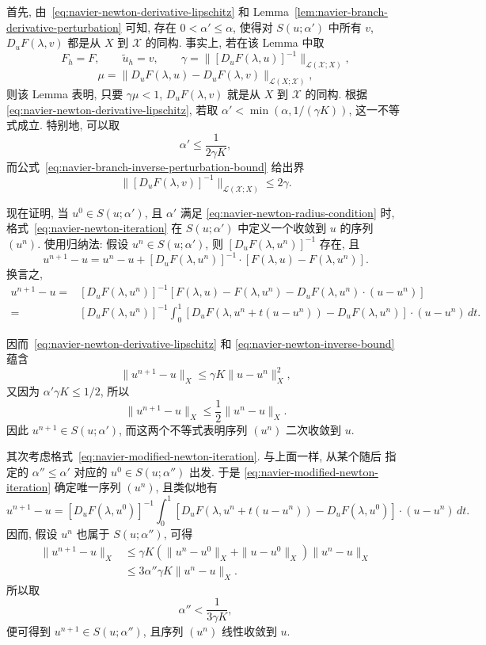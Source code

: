 \begin{Proof}
首先, 由 \,\eqref{eq:navier-newton-derivative-lipschitz} 和
Lemma~\ref{lem:navier-branch-derivative-perturbation} 可知, 存在
$0<\alpha'\leq\alpha$, 使得对 $S(u;\alpha')$ 中所有 $v$,
$D_uF(\lambda,v)$ 都是从 $X$ 到 $\mathscr X$ 的同构. 事实上, 若在该 Lemma 中取
\[
F_h=F,\qquad\widetilde u_h=v,
\qquad\gamma=\|[D_uF(\lambda,u)]^{-1}\|_{\mathcal L(\mathscr X;X)},
\]
\[
\mu=\|D_uF(\lambda,u)-D_uF(\lambda,v)\|_{\mathcal L(X;\mathscr X)},
\]
则该 Lemma 表明, 只要 $\gamma\mu<1$, $D_uF(\lambda,v)$ 就是从 $X$ 到
$\mathscr X$ 的同构. 根据 \,\eqref{eq:navier-newton-derivative-lipschitz},
若取 $\alpha'<\min(\alpha,1/(\gamma K))$, 这一不等式成立. 特别地, 可以取
\begin{equation}
\label{eq:navier-newton-radius-condition}
\alpha'\leq\frac1{2\gamma K},
\end{equation}
而公式 \,\eqref{eq:navier-branch-inverse-perturbation-bound} 给出界
\begin{equation}
\label{eq:navier-newton-inverse-bound}
\|[D_uF(\lambda,v)]^{-1}\|_{\mathcal L(\mathscr X;X)}\leq2\gamma.
\end{equation}

现在证明, 当 $u^0\in S(u;\alpha')$, 且 $\alpha'$ 满足
\eqref{eq:navier-newton-radius-condition} 时, 格式 \,\eqref{eq:navier-newton-iteration}
在 $S(u;\alpha')$ 中定义一个收敛到 $u$ 的序列 $(u^n)$. 使用归纳法: 假设
$u^n\in S(u;\alpha')$, 则 $[D_uF(\lambda,u^n)]^{-1}$ 存在, 且
\[
u^{n+1}-u=u^n-u+[D_uF(\lambda,u^n)]^{-1}
\mathbin{\cdot}[F(\lambda,u)-F(\lambda,u^n)].
\]
换言之,
\[
\begin{aligned}
u^{n+1}-u
={}&[D_uF(\lambda,u^n)]^{-1}
[F(\lambda,u)-F(\lambda,u^n)-D_uF(\lambda,u^n)\mathbin{\cdot}(u-u^n)]\\
={}&[D_uF(\lambda,u^n)]^{-1}
\int_0^1[D_uF(\lambda,u^n+t(u-u^n))-D_uF(\lambda,u^n)]
\mathbin{\cdot}(u-u^n)\,dt.
\end{aligned}
\]

因而 \,\eqref{eq:navier-newton-derivative-lipschitz} 和
\eqref{eq:navier-newton-inverse-bound} 蕴含
\[
\|u^{n+1}-u\|_X\leq\gamma K\|u-u^n\|_X^2,
\]
又因为 $\alpha'\gamma K\leq1/2$, 所以
\[
\|u^{n+1}-u\|_X\leq\frac12\|u^n-u\|_X.
\]
因此 $u^{n+1}\in S(u;\alpha')$, 而这两个不等式表明序列 $(u^n)$ 二次收敛到 $u$.

其次考虑格式 \,\eqref{eq:navier-modified-newton-iteration}. 与上面一样, 从某个随后
指定的 $\alpha''\leq\alpha'$ 对应的 $u^0\in S(u;\alpha'')$ 出发. 于是
\eqref{eq:navier-modified-newton-iteration} 确定唯一序列 $(u^n)$, 且类似地有
\[
u^{n+1}-u=[D_uF(\lambda,u^0)]^{-1}
\int_0^1[D_uF(\lambda,u^n+t(u-u^n))-D_uF(\lambda,u^0)]
\mathbin{\cdot}(u-u^n)\,dt.
\]
因而, 假设 $u^n$ 也属于 $S(u;\alpha'')$, 可得
\[
\begin{aligned}
\|u^{n+1}-u\|_X
&\leq\gamma K(\|u^n-u^0\|_X+\|u-u^0\|_X)\|u^n-u\|_X\\
&\leq3\alpha''\gamma K\|u^n-u\|_X.
\end{aligned}
\]
所以取
\[
\alpha''<\frac1{3\gamma K},
\]
便可得到 $u^{n+1}\in S(u;\alpha'')$, 且序列 $(u^n)$ 线性收敛到 $u$.
\end{Proof}

